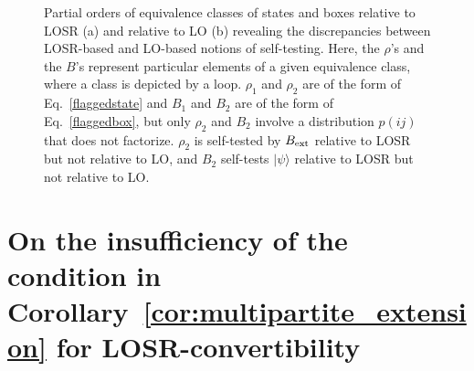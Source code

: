 \documentclass[prx,11pt,letterpaper,twocolumn,accepted=2023-11-27]{quantumarticle}
\theoremstyle{plain}
\theoremstyle{definition}
\begin{document}
\begin{appendices}
 \begin{figure}[h!]
 \centering
    \hspace{3mm}
    \caption{Partial orders of equivalence classes of states and boxes relative to LOSR (a) and relative to LO (b) revealing the discrepancies between LOSR-based and LO-based notions of self-testing.  Here, the $\rho$'s and the $B$'s represent particular elements of a given equivalence class, where a class is depicted by a loop. $\rho_1$ and $\rho_2$ are of the form of Eq.~\eqref{flaggedstate} and $B_1$ and $B_2$ are of the form of Eq.~\eqref{flaggedbox}, but only $\rho_2$ and $B_2$ involve a distribution $p(ij)$ that does not factorize.  
 $\rho_2$ is self-tested by $B_{\rm ext}$ relative to LOSR but not relative to LO, and $B_2$ self-tests $|\psi\rangle$ relative to LOSR but not relative to LO.
   }
    \label{LOvsLOSRorders}
\end{figure}





\section{On the insufficiency of the condition in Corollary~\ref{cor:multipartite_extension} for LOSR-convertibility} \label{insufficiency}


\end{appendices}
\end{document}
